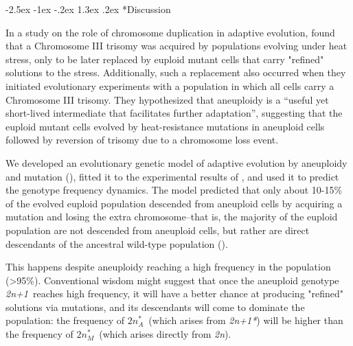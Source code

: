 \documentclass[12pt]{extarticle}
\makeatletter
\renewcommand\section{\@startsection {section}{1}{\z@}%
     {-2.5ex \@plus -1ex \@minus -.2ex}%
     {1.3ex \@plus.2ex}%
    {\Large\bfseries}}
\newcommand{\euwt}{\emph{2n}}
\newcommand{\anwt}{\emph{2n+1}}
\newcommand{\eumtM}{\emph{$2n^*_M$}}
\newcommand{\eumtA}{\emph{$2n^*_A$}}
\newcommand{\anmt}{\emph{2n+1*}}
\makeatother
\begin{document}
\section*{Discussion}

In a study on the role of chromosome duplication in adaptive evolution, 
\citet{Yona2012} found that a Chromosome III trisomy was acquired by \yeast populations evolving under heat stress, only to be later replaced by euploid mutant cells that carry "refined" solutions to the stress. 
Additionally, such a replacement also occurred when they initiated evolutionary experiments with a population in which all cells carry a Chromosome III trisomy.
They hypothesized that aneuploidy is a ``useful yet short-lived intermediate that facilitates further adaptation'', suggesting that the euploid mutant cells evolved by heat-resistance mutations in aneuploid cells followed by reversion of trisomy due to a chromosome loss event. 

We developed an evolutionary genetic model of adaptive evolution by aneuploidy and mutation (), fitted it to the experimental results of \citet{Yona2012}, and used it to predict the genotype frequency dynamics.
The model predicted that only about 10-15\% of the evolved euploid population descended from aneuploid cells by acquiring a mutation and losing the extra chromosome--that is, the majority of the euploid population are not descended from aneuploid cells, but rather are direct descendants of the ancestral wild-type population ().

This happens despite aneuploidy reaching a high frequency in the population (>95\%). 
Conventional wisdom might suggest that once the aneuploid genotype \anwt\ reaches high frequency, it will have a better chance at producing "refined" solutions via mutations, and its descendants will come to dominate the population: the frequency of \eumtA\ (which arises from \anmt) will be higher than the frequency of \eumtM\ (which arises directly from \euwt).
\end{document}

